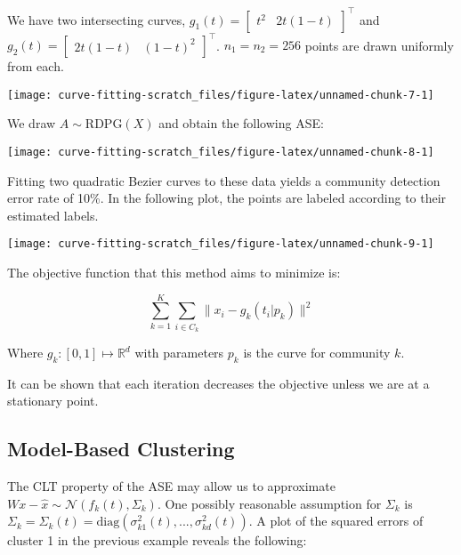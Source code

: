 \documentclass[
  11pt,
]{article}
\begin{document}
\begin{example}



We have two intersecting curves, $g_1(t) = \begin{bmatrix} t^2 & 2 t (1 - t) \end{bmatrix}^\top$ and $g_2(t) = \begin{bmatrix} 2 t (1 - t) & (1 - t) ^ 2 \end{bmatrix}^\top$. $n_1 = n_2 = 256$ points are drawn uniformly from each.


\begin{center}\texttt{[image: curve-fitting-scratch\_files/figure-latex/unnamed-chunk-7-1]} \end{center}

We draw $A \sim \mathrm{RDPG}(X)$ and obtain the following ASE:


\begin{center}\texttt{[image: curve-fitting-scratch\_files/figure-latex/unnamed-chunk-8-1]} \end{center}

Fitting two quadratic Bezier curves to these data yields a community detection error rate of 10\%. 
In the following plot, the points are labeled according to their estimated labels.


\begin{center}\texttt{[image: curve-fitting-scratch\_files/figure-latex/unnamed-chunk-9-1]} \end{center}

\end{example}

The objective function that this method aims to minimize is:

\[\sum_{k=1}^K \sum_{i \in C_k} \|x_i - g_k(t_i | p_k)\|^2\]

Where \(g_k : [0, 1] \mapsto \mathbb{R}^d\) with parameters \(p_k\) is
the curve for community \(k\).

It can be shown that each iteration decreases the objective unless we
are at a stationary point.

\hypertarget{model-based-clustering}{%
\subsection{Model-Based Clustering}\label{model-based-clustering}}

The CLT property of the ASE may allow us to approximate
\(W x - \hat{x} \sim \mathcal{N}(f_k(t), \Sigma_k)\). One possibly
reasonable assumption for \(\Sigma_k\) is
\(\Sigma_k = \Sigma_k(t) = \mathrm{diag}(\sigma_{k1}^2(t), ..., \sigma_{kd}^2(t))\).
A plot of the squared errors of cluster 1 in the previous example
reveals the following:
\end{document}
